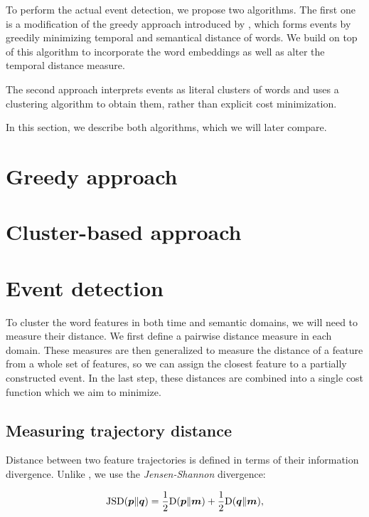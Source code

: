 
To perform the actual event detection, we propose two algorithms. The first one is a modification of the greedy approach introduced by \cite{event-detection}, which forms events by greedily minimizing temporal and semantical distance of words. We build on top of this algorithm to incorporate the word embeddings as well as alter the temporal distance measure.

The second approach interprets events as literal clusters of words and uses a clustering algorithm to obtain them, rather than explicit cost minimization.

In this section, we describe both algorithms, which we will later compare.


\section{Greedy approach}


\section{Cluster-based approach}


\section{Event detection}
To cluster the word features in both time and semantic domains, we will need to measure their distance. We first define a pairwise distance measure in each domain. These measures are then generalized to measure the distance of a feature from a whole set of features, so we can assign the closest feature to a partially constructed event. In the last step, these distances are combined into a single cost function which we aim to minimize.


\subsection{Measuring trajectory distance}

Distance between two feature trajectories is defined in terms of their information divergence. Unlike \cite{event-detection}, we use the \textit{Jensen-Shannon} divergence:

\begin{equation*}
	\featsim( \vect{p} \| \vect{q} ) = \frac{1}{2} \text{D}( \vect{p} \| \vect{m} ) + \frac{1}{2} \text{D}( \vect{q} \| \vect{m} ),
\end{equation*}

